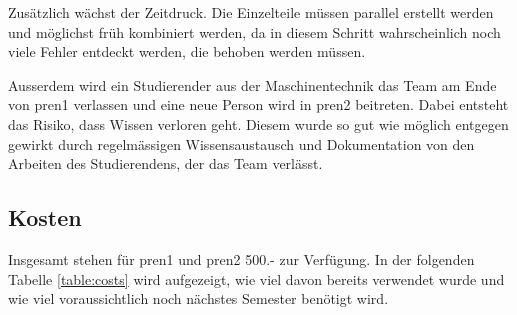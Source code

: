 Zusätzlich wächst der Zeitdruck. Die Einzelteile müssen parallel erstellt werden und möglichst früh kombiniert werden, da in diesem Schritt wahrscheinlich noch viele Fehler entdeckt werden, die behoben werden müssen. 

Ausserdem wird ein Studierender aus der Maschinentechnik das Team am Ende von \acrshort{pren1} verlassen und eine neue Person wird in \acrshort{pren2} beitreten. Dabei entsteht das Risiko, dass Wissen verloren geht. Diesem wurde so gut wie möglich entgegen gewirkt durch regelmässigen Wissensaustausch und Dokumentation von den Arbeiten des Studierendens, der das Team verlässt.

\subsection{Kosten}\label{kosten}

Insgesamt stehen für \acrshort{pren1} und \acrshort{pren2} 500.- zur Verfügung. In der folgenden Tabelle \ref{table:costs} wird aufgezeigt, wie viel davon bereits verwendet wurde und wie viel voraussichtlich noch nächstes Semester benötigt wird.

